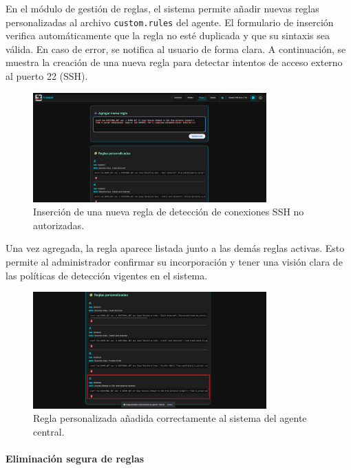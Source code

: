 \documentclass[11pt,a4paper,twoside]{report}
\begin{document}
En el módulo de gestión de reglas, el sistema permite añadir nuevas reglas personalizadas al archivo \texttt{custom.rules} del agente. El formulario de inserción verifica automáticamente que la regla no esté duplicada y que su sintaxis sea válida. En caso de error, se notifica al usuario de forma clara. A continuación, se muestra la creación de una nueva regla para detectar intentos de acceso externo al puerto 22 (SSH).

\begin{figure}[H]
	\centering
	\includegraphics[width=0.8\textwidth]{pruebas/5.png}
	\caption{Inserción de una nueva regla de detección de conexiones SSH no autorizadas.}
	\label{fig:insertar_regla_ssh}
\end{figure}

Una vez agregada, la regla aparece listada junto a las demás reglas activas. Esto permite al administrador confirmar su incorporación y tener una visión clara de las políticas de detección vigentes en el sistema.

\begin{figure}[H]
	\centering
	\includegraphics[width=0.8\textwidth]{pruebas/6.png}
	\caption{Regla personalizada añadida correctamente al sistema del agente central.}
	\label{fig:regla_ssh_insertada}
\end{figure}

\paragraph{Eliminación segura de reglas}
\end{document}
